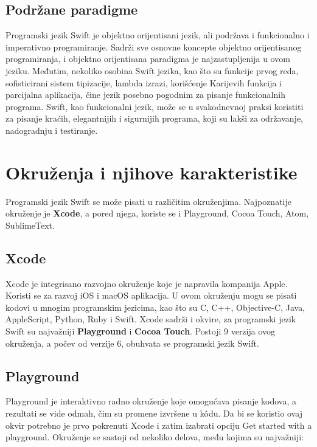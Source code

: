\documentclass[a4paper]{article}
\begin{document}
\subsection{Podržane paradigme}
\label{subsec:podnaslovParadigma}
Programski jezik Swift je objektno orijentisani jezik, ali podržava i funkcionalno i imperativno
programiranje. Sadrži sve osnovne koncepte objektno orijentisanog programiranja, i objektno orijentisana paradigma je najzastupljenija u ovom jeziku. Međutim, nekoliko osobina Swift jezika, kao što su funkcije prvog reda, sofisticirani sistem tipizacije, lambda izrazi, korišćenje Karijevih funkcija i parcijalna aplikacija, čine jezik posebno pogodnim za pisanje funkcionalnih programa\cite{rad}. Swift, kao funkcionalni jezik, može se u svakodnevnoj praksi koristiti za pisanje kraćih, elegantnijih i sigurnijih programa, koji su lakši za održavanje, nadogradnju i testiranje.

\section{Okruženja i njihove karakteristike}	
\label{sec:petiDeo}
Programski jezik Swift se može pisati u različitim okruženjima. Najpoznatije okruženje je \textbf{Xcode}, a pored njega, koriste se i Playground, Cocoa Touch, Atom, SublimeText.

\subsection{Xcode}
\label{subsec:podnaslovXcode}
Xcode  je integrisano razvojno okruženje koje je napravila kompanija Apple. Koristi se za razvoj iOS i macOS aplikacija. U ovom okruženju mogu se pisati kodovi u mnogim programskim jezicima, kao što su C, C++, Objective-C, Java, AppleScript, Python, Ruby i Swift. Xcode sadrži i okvire, za programski jezik Swift su najvažniji \textbf{Playground} i \textbf{Cocoa Touch}. 
Postoji 9 verzija ovog okruženja, a počev od verzije 6, obuhvata se programski jezik Swift.

\subsection{Playground}
\label{subsec:podnaslovPlayground}
Playground je interaktivno radno okruženje koje omogućava pisanje kodova, a rezultati se vide odmah, čim su promene izvršene u k\^{o}du. Da bi se koristio ovaj okvir potrebno je prvo pokrenuti Xcode i zatim izabrati opciju Get started with a playground. Okruženje se sastoji od nekoliko delova, među kojima su najvažniji:
 
\end{document}
